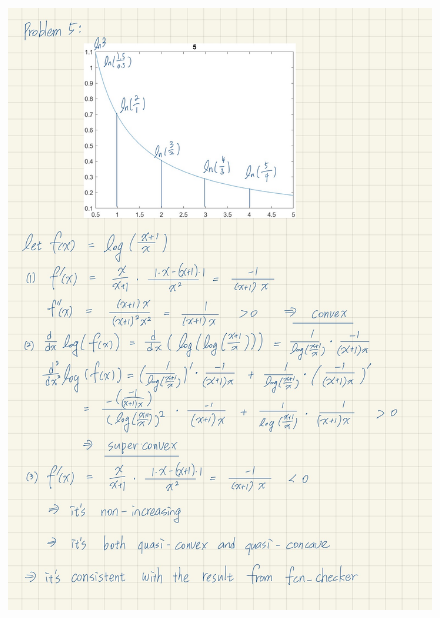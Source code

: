 \documentclass[a4paper, onecolumn, , 11pt]{IEEEtran}
\begin{document}
    \begin{figure}
        \centering
        \includegraphics[width=1\textwidth]{proofs/prob5.jpg}
    \end{figure}
\end{document}
